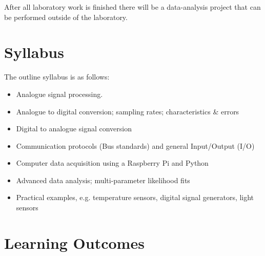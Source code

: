 After all laboratory work is finished there will be a data-analysis project that can be performed outside of the laboratory.

\newpage
\section{Syllabus}

The outline syllabus is as follows:
\begin{itemize}
\item Analogue signal processing. %
\item Analogue to digital conversion; sampling rates; characteristics \& errors
\item Digital to analogue signal conversion
\item Communication protocols (Bus standards) and general Input/Output (I/O)
\item Computer data acquisition using a Raspberry Pi and Python %
\item Advanced data analysis; multi-parameter likelihood fits
\item Practical examples, e.g. temperature sensors, digital signal generators, light sensors
\end{itemize}

\section{Learning Outcomes}


